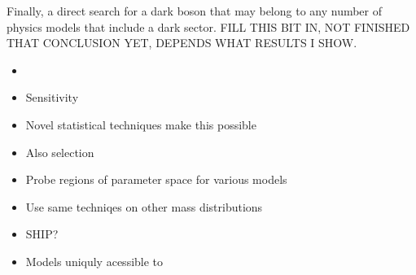 %
%
%







Finally, a direct search for a dark boson that may belong to any number of \bsm physics models that
include a dark sector.
FILL THIS BIT IN, NOT FINISHED THAT CONCLUSION YET, DEPENDS WHAT RESULTS I SHOW.
\begin{itemize}
  \item \btokstrdb
  \item Sensitivity
  \item Novel statistical techniques make this possible
  \item Also selection
  \item Probe regions of parameter space for various models
  \item Use same techniqes on other mass distributions
  \item SHIP?
  \item Models uniquly acessible to \lhcb
\end{itemize}


